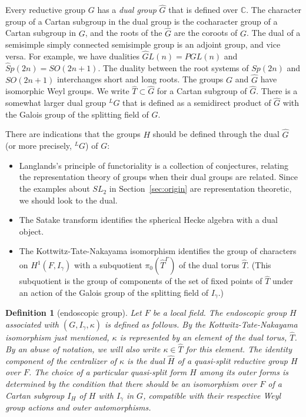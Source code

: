 \documentclass[brochure,english,12pt]{bourbaki}
\theoremstyle{plain}
\newtheorem{definition}[equation]{Definition}
\newcommand{\ring}[1]{\mathbb{#1}}
\begin{document}
Every reductive group $G$ has a {\it dual group} $\hat G$ that is defined over $\ring{C}$.
The character group of a Cartan subgroup in the
dual group is the cocharacter group of a Cartan subgroup in $G$, and
the roots of the $\hat G$ are the coroots of $G$.  The dual of a
semisimple simply connected semisimple group is an adjoint group, and
vice versa.  For example, we have dualities $\hat GL(n) = PGL(n)$ and
$\hat Sp(2n)=SO(2n+1)$.  The duality between the root systems of
$Sp(2n)$ and $SO(2n+1)$ interchanges short and long roots.  The groups
$G$ and $\hat G$ have isomorphic Weyl groups.  We write $\hat T\subset
\hat G$ for a Cartan subgroup of $\hat G$.  There is a somewhat larger
dual group ${}^LG$ that is defined as a semidirect product of $\hat G$
with the Galois group of the splitting field of $G$.

There are indications that the groups $H$ should be defined through  
the dual $\hat G$ (or more precisely, ${}^LG$) of $G$:
\begin{itemize}
\item Langlands's principle of functoriality is a collection of
  conjectures, relating  the representation theory of groups
  when their dual groups are related.  Since the
  examples about $SL_2$ in Section~\ref{sec:origin} are representation
  theoretic, we should look to the dual.
\item The Satake transform identifies the spherical Hecke algebra with
  a dual object.  
\item The Kottwitz-Tate-Nakayama isomorphism identifies the group of
  characters on $H^1(F,I_\gamma)$ with a subquotient $\pi_0(\hat T^\Gamma)$
  of the dual torus $\hat T$.  (This subquotient is the group of
  components of the set of fixed points of $\hat T$ under an action of the Galois group of the
splitting field of $I_\gamma$.)
\end{itemize}

\begin{definition}[endoscopic group]  Let $F$ be a local field.
  The {\it endoscopic group} $H$ associated with $(G,I_\gamma,\kappa)$ is defined
  as follows.  By the Kottwitz-Tate-Nakayama isomorphism just
  mentioned, $\kappa$ is represented by an element of the dual torus,
  $\hat T$.  By an abuse of notation, we will also write $\kappa\in
  \hat T$ for this element.  The identity component of the
  centralizer of $\kappa$ is the dual $\hat H$ of a quasi-split
  reductive group $H$ over $F$.  The choice of a particular quasi-split form $H$
  among its outer forms is determined by the condition that there should
  be an isomorphism over $F$ of a Cartan subgroup $I_H$ of $H$ with
  $I_\gamma$ in $G$, compatible with their respective Weyl group actions and outer
automorphisms.
\end{definition}
\end{document}
